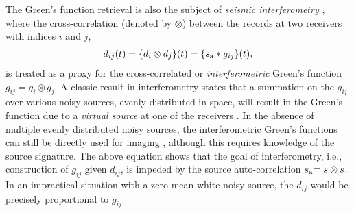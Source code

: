 \documentclass{article}
\theoremstyle{definition}
\newcommand\sa[1][]{{#1{s}}_{\rm a}}
\begin{document}
The Green's function retrieval is also the subject of 
\emph{seismic interferometry}
\citep{schuster2004interferometric,snieder2004extracting,shapiro2005high,wapenaar2006unified,curtis2006seismic,schuster2009seismic}, where
the
cross-correlation (denoted by $\otimes$) 
between the records at two receivers with indices $i$ and $j$, 
\begin{eqnarray}
	d_{ij}(t) = \{d_{i}\otimes d_{j}\}(t) = %
	\{
	\sa
	\ast 
	g_{ij}
	\}
	(t),
	\label{eqn:intro1}
\end{eqnarray}
is
treated as a proxy for 
the cross-correlated or \emph{interferometric} Green's function 
$g_{ij}{=g_{i}\otimes g_{j}}$.
%
A classic result in interferometry states that 
a summation on the $g_{ij}$ 
over various {noisy sources}, 
evenly distributed in space,
will result in the Green's function due to a \emph{virtual source} 
at one of the receivers \citep{wapenaar2006green}.
%
In the absence of multiple evenly dis\-tributed {noisy sources},
the inter\-fero\-metric Green's functions can {still} be directly used for imaging
\citep{claerbout1968synthesis,draganov2006seismic,borcea2006coherent,demanet2017convex,vidal2014retrieval},
{although this requires knowledge of the source signature.} 
%
The above equation shows
that the 
goal of interferometry, i.e.,
construction of 
$g_{ij}$
given {$d_{ij}$},
is impeded 
by the source  
auto-correlation $\sa {=s\otimes s}$.
%
In an impractical
situation with 
a zero-mean white {noisy source},
the {$d_{ij}$} %
would be precisely proportional to {$g_{ij}$}%
\end{document}
